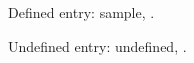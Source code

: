 \documentclass{article}
\begin{document}
Defined entry: \gls{sample}, .

Undefined entry: \gls{undefined}, .

\printglossaries
\end{document}
